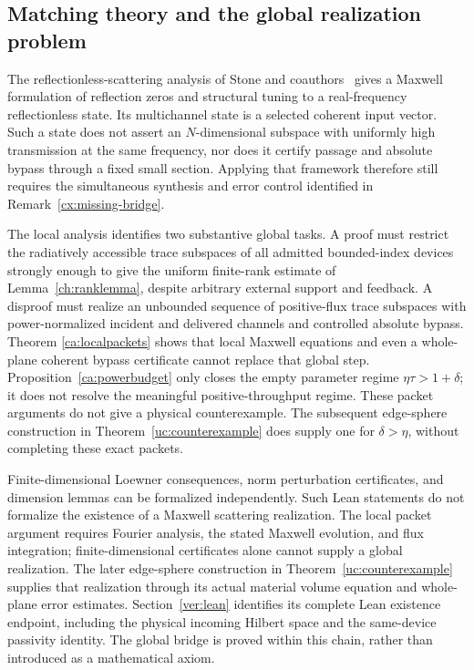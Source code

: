 \subsection{Matching theory and the global realization problem}

The reflectionless-scattering analysis of Stone and coauthors~\cite{stone2021}
gives a Maxwell formulation of reflection zeros
and structural tuning to a real-frequency reflectionless state.  Its
multichannel state is a selected coherent input vector.  Such a state
does not assert an $N$-dimensional subspace with uniformly high
transmission at the same frequency, nor does it certify passage and
absolute bypass through a fixed small section.  Applying that framework
therefore still requires the simultaneous synthesis and error control
identified in Remark~\ref{cx:missing-bridge}.

\begin{remark}
\label{ca:decisivebridge}
The local analysis identifies two substantive global tasks.
A proof must restrict the radiatively accessible trace subspaces of all
admitted bounded-index devices strongly enough to give the uniform
finite-rank estimate of Lemma~\ref{ch:ranklemma}, despite arbitrary
external support and feedback.  A disproof must realize an unbounded
sequence of positive-flux trace subspaces with power-normalized incident
and delivered channels and controlled absolute bypass.  Theorem
\ref{ca:localpackets} shows that local Maxwell equations and even a
whole-plane coherent bypass certificate cannot replace that global step.
Proposition~\ref{ca:powerbudget} only closes the empty parameter regime
$\eta\tau>1+\delta$; it does not resolve the meaningful positive-throughput
regime. These packet arguments do not give a physical counterexample.
The subsequent edge-sphere construction in Theorem~\ref{uc:counterexample}
does supply one for $\delta>\eta$, without completing these exact packets.
\end{remark}

\begin{remark}
\label{ca:leanboundary}
Finite-dimensional Loewner consequences, norm perturbation certificates,
and dimension lemmas can be formalized independently.  Such Lean
statements do not formalize the existence of a Maxwell scattering
realization. The local packet argument requires Fourier analysis,
the stated Maxwell evolution, and flux integration; finite-dimensional
certificates alone cannot supply a global realization. The later
edge-sphere construction in Theorem~\ref{uc:counterexample} supplies
that realization through its actual material volume equation and
whole-plane error estimates. Section~\ref{ver:lean} identifies its
complete Lean existence endpoint, including the physical incoming
Hilbert space and the same-device passivity identity. The global bridge
is proved within this chain, rather than introduced as a mathematical
axiom.
\end{remark}
